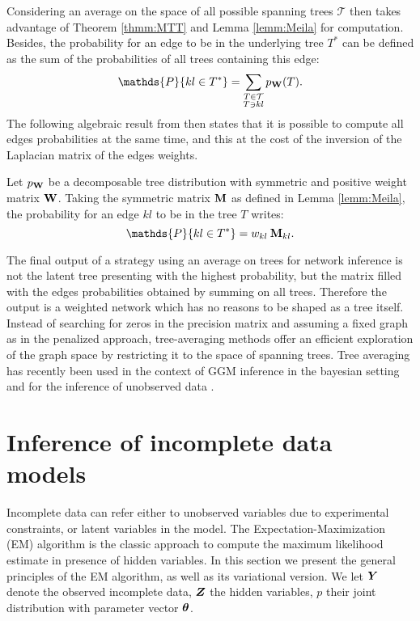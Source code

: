Considering an average on the space of all possible spanning trees $\mathcal{T}$ then takes advantage of Theorem \ref{thmm:MTT} and Lemma \ref{lemm:Meila} for computation. Besides, the probability for an edge to be in the underlying tree $T^*$ can be defined as the sum of the probabilities of all trees containing this edge:
$$\mathds{P}\{kl\in T^*\} = \sum_{\substack{T\in \mathcal{T}\\ T \ni kl}} p_{\Wbf}(T).$$
The following algebraic result from \cite{kirshner} then  states that it is possible to compute all edges probabilities at the same time, and this at the cost of the inversion of the  Laplacian matrix of the edges weights.

\begin{lemma}  \label{lem:Kirshner}
    Let $p_{{\bf W}}$ be a decomposable tree distribution with symmetric and positive weight matrix ${\bf W}$. Taking the symmetric matrix ${\bf M}$ as defined in Lemma  \ref{lemm:Meila}, the probability for an edge $kl$ to be in the tree $T$ writes:
$$\mathds{P}\{kl\in T^*\} =  w_{kl}\: \Mbf_{kl}.$$
\end{lemma}

The final output of a strategy using an average on trees for network inference is not the latent tree presenting with the highest probability, but the matrix filled with the edges probabilities obtained by summing on all trees. Therefore the output is a weighted network which has no reasons to be shaped as a tree itself. Instead of searching for zeros in the precision matrix and assuming a fixed graph as in the penalized approach, tree-averaging methods offer an efficient exploration of the graph space by restricting it to the space of spanning trees. Tree averaging has recently been used in the context of GGM inference in the bayesian setting \citep{SR15} and for the inference of unobserved data \citep{RAR19}.


\section{Inference of incomplete data models}
Incomplete data can refer either to unobserved variables due to experimental constraints, or latent variables in the model. The Expectation-Maximization (EM) algorithm \citep{DLR77} is the classic approach to compute the maximum likelihood estimate in presence of hidden variables. In this section we present the general principles of the EM algorithm, as well as its variational version. We let ${\boldsymbol{Y}}$ denote the observed incomplete data, ${\boldsymbol{Z}}$ the hidden variables, $p$ their joint distribution with parameter vector ${\boldsymbol{\theta}}$.
 
